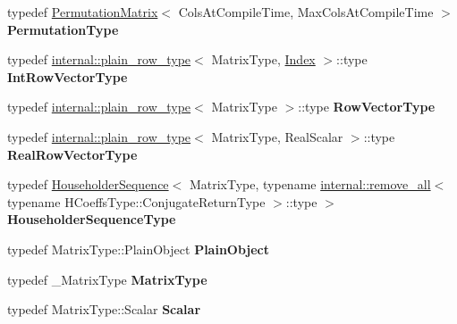 \begin{DoxyCompactItemize}
typedef \hyperlink{group___core___module_class_eigen_1_1_permutation_matrix}{Permutation\+Matrix}$<$ Cols\+At\+Compile\+Time, Max\+Cols\+At\+Compile\+Time $>$ {\bfseries Permutation\+Type}
\item 
\mbox{\label{group___q_r___module_acc44ac642c48935fe0da40c25035aa86}} 
typedef \hyperlink{struct_eigen_1_1internal_1_1plain__row__type}{internal\+::plain\+\_\+row\+\_\+type}$<$ Matrix\+Type, \hyperlink{namespace_eigen_a62e77e0933482dafde8fe197d9a2cfde}{Index} $>$\+::type {\bfseries Int\+Row\+Vector\+Type}
\item 
\mbox{\label{group___q_r___module_a7034cb4035db5e3d7c538c27c3d15212}} 
typedef \hyperlink{struct_eigen_1_1internal_1_1plain__row__type}{internal\+::plain\+\_\+row\+\_\+type}$<$ Matrix\+Type $>$\+::type {\bfseries Row\+Vector\+Type}
\item 
\mbox{\label{group___q_r___module_aa14f4af8219de2dcd8a1c43546d9dd4a}} 
typedef \hyperlink{struct_eigen_1_1internal_1_1plain__row__type}{internal\+::plain\+\_\+row\+\_\+type}$<$ Matrix\+Type, Real\+Scalar $>$\+::type {\bfseries Real\+Row\+Vector\+Type}
\item 
\mbox{\label{group___q_r___module_a9d4e0e44ac23ad8baf0f91e91b982dec}} 
typedef \hyperlink{group___householder___module_class_eigen_1_1_householder_sequence}{Householder\+Sequence}$<$ Matrix\+Type, typename \hyperlink{struct_eigen_1_1internal_1_1remove__all}{internal\+::remove\+\_\+all}$<$ typename H\+Coeffs\+Type\+::\+Conjugate\+Return\+Type $>$\+::type $>$ {\bfseries Householder\+Sequence\+Type}
\item 
\mbox{\label{group___q_r___module_a4db9c08da38e11bd598ed743061966b1}} 
typedef Matrix\+Type\+::\+Plain\+Object {\bfseries Plain\+Object}
\item 
\mbox{\label{group___q_r___module_a8eba7b5263a0241cb477b3531f5ef609}} 
typedef \+\_\+\+Matrix\+Type {\bfseries Matrix\+Type}
\item 
\mbox{\label{group___q_r___module_a1aa69ca9c8caf074891ed9177a754361}} 
typedef Matrix\+Type\+::\+Scalar {\bfseries Scalar}
\item 

\end{DoxyCompactItemize}
